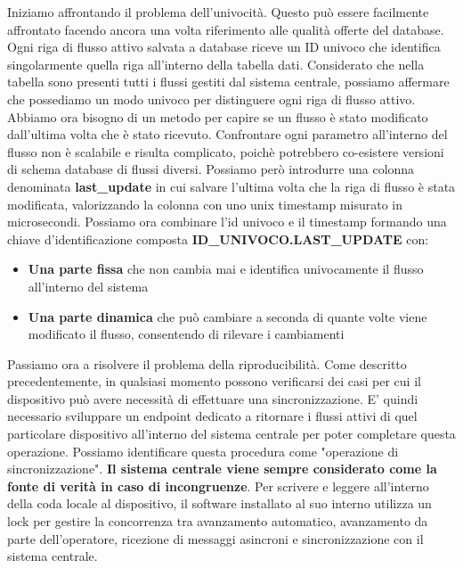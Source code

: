\documentclass[a4paper, titlepage, 12pt, openright, twoside]{book}
\begin{document}
Iniziamo affrontando il problema dell'univocità. Questo può essere facilmente affrontato facendo ancora una volta riferimento alle qualità offerte del database. Ogni riga di flusso attivo salvata a database riceve un ID univoco che identifica singolarmente quella riga all'interno della tabella dati. Considerato che nella tabella sono presenti tutti i flussi gestiti dal sistema centrale, possiamo affermare che possediamo un modo univoco per distinguere ogni riga di flusso attivo.
\newline
Abbiamo ora bisogno di un metodo per capire se un flusso è stato modificato dall'ultima volta che è stato ricevuto. Confrontare ogni parametro all'interno del flusso non è scalabile e risulta complicato, poichè potrebbero co-esistere versioni di schema database di flussi diversi. Possiamo però introdurre una colonna denominata \textbf{last\_update} in cui salvare l'ultima volta che la riga di flusso è stata modificata, valorizzando la colonna con uno unix timestamp misurato in microsecondi.
\newline
Possiamo ora combinare l'id univoco e il timestamp formando una chiave d'identificazione composta \textbf{ID\_UNIVOCO.LAST\_UPDATE} con:
\begin{itemize}
	\item \textbf{Una parte fissa} che non cambia mai e identifica univocamente il flusso all'interno del sistema
	\item \textbf{Una parte dinamica} che può cambiare a seconda di quante volte viene modificato il flusso, consentendo di rilevare i cambiamenti
\end{itemize}
Passiamo ora a risolvere il problema della riproducibilità. Come descritto precedentemente, in qualsiasi momento possono verificarsi dei casi per cui il dispositivo può avere necessità di effettuare una sincronizzazione. E' quindi necessario sviluppare un endpoint dedicato a ritornare i flussi attivi di quel particolare dispositivo all'interno del sistema centrale per poter completare questa operazione. Possiamo identificare questa procedura come "operazione di sincronizzazione". \textbf{Il sistema centrale viene sempre considerato come la fonte di verità in caso di incongruenze}. Per scrivere e leggere all'interno della coda locale al dispositivo, il software installato al suo interno utilizza un lock per gestire la concorrenza tra avanzamento automatico, avanzamento da parte dell'operatore, ricezione di messaggi asincroni e sincronizzazione con il sistema centrale.
\end{document}
